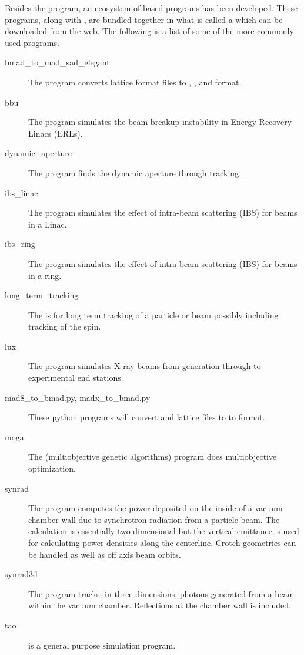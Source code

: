 Besides the \tao program, an ecosystem of \bmad based programs has been developed. These programs,
along with \bmad, are bundled together in what is called a \bmad {} which can be
downloaded from the web. The following is a list of some of the more commonly used programs.
  \begin{description}
%
  \item[bmad_to_mad_sad_elegant] \Newline
The  program converts \bmad lattice format files to ,
,  and  format.
%
  \item[bbu] \Newline
The  program simulates the beam breakup instability in Energy Recovery Linacs (ERLs). 
%
  \item[dynamic_aperture] \Newline
The  program finds the dynamic aperture through tracking.
%
  \item[ibs_linac] \Newline
The  program simulates the effect of intra-beam scattering (IBS) for beams in a Linac.
%
  \item[ibs_ring] \Newline
The  program simulates the effect of intra-beam scattering (IBS) for beams
in a ring.
%
  \item[long_term_tracking] \Newline
The  is for long term tracking of a particle or beam possibly
including tracking of the spin.
%
  \item[lux] \Newline
The  program simulates X-ray beams from generation through to experimental end stations.
%
  \item[mad8_to_bmad.py, madx_to_bmad.py] \Newline
These python programs will convert  and  lattice files to to \bmad format. 
%
  \item[moga] \Newline
The  (multiobjective genetic algorithms) program does multiobjective optimization.
%
  \item[synrad] \Newline
The  program computes the power deposited on the inside of a vacuum chamber
wall due to synchrotron radiation from a particle beam. The calculation is essentially two
dimensional but the vertical emittance is used for calculating power densities along the
centerline. Crotch geometries can be handled as well as off axis beam orbits. 
%
  \item[synrad3d] \Newline
The  program tracks, in three dimensions, photons generated from a beam
within the vacuum chamber. Reflections at the chamber wall is included.
%
  \item[tao] \Newline
\tao is a general purpose simulation program.
  \end{description}

